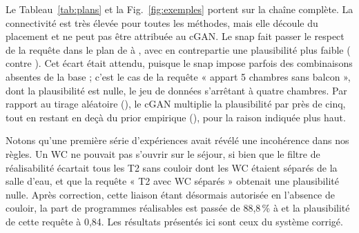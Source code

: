 \documentclass[twocolumn]{ICCKjournal}
\begin{document}
Le Tableau~\ref{tab:plans} et la Fig.~\ref{fig:exemples} portent sur la
chaîne complète. La connectivité est très élevée pour toutes les
méthodes, mais elle découle du placement et ne peut pas être attribuée
au cGAN. Le snap fait passer le respect de la requête dans le plan de
\resPlanCganBrutRespectPlan{} à \resPlanCganSnapRespectPlan{}, avec en
contrepartie une plausibilité plus faible (\resPlanCganSnapPlausibilite{}
contre \resPlanCganBrutPlausibilite{}). Cet écart était attendu, puisque
le snap impose parfois des combinaisons absentes de la base ; c'est le
cas de la requête « appart 5 chambres sans balcon », dont la
plausibilité est nulle, le jeu de données s'arrêtant à quatre chambres.
Par rapport au tirage aléatoire (\resPlanAleatoirePlausibilite{}), le
cGAN multiplie la plausibilité par près de cinq, tout en restant en deçà
du prior empirique (\resPlanPriorPlausibilite{}), pour la raison
indiquée plus haut.

Notons qu'une première série d'expériences avait révélé une incohérence
dans nos règles. Un WC ne pouvait pas s'ouvrir sur le séjour, si bien que
le filtre de réalisabilité écartait tous les T2 sans couloir dont les WC
étaient séparés de la salle d'eau, et que la requête « T2 avec WC
séparés » obtenait une plausibilité nulle. Après correction, cette
liaison étant désormais autorisée en l'absence de couloir, la part de
programmes réalisables est passée de 88,8\,\% à \resDsAcceptance{} et la
plausibilité de cette requête à 0,84. Les résultats présentés ici sont
ceux du système corrigé.
\end{document}
